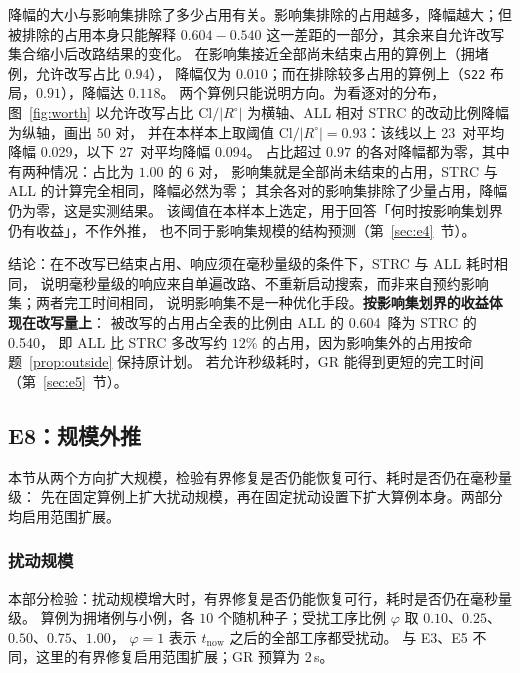 \documentclass[manuscript,screen,review]{acmart}
\providecommand{\STRC}{\textsc{STRC}}
\newcommand{\NSeeds}{10}
\newcommand{\NPairs}{50}
\newcommand{\ResFracCheapRtwo}{0.540}
\newcommand{\ResFracAllFuture}{0.604}
\newcommand{\ScaleCloAliveHi}{0.91}  %
\newcommand{\WorthThresh}{0.93}
\newcommand{\WorthLowN}{27}
\newcommand{\WorthLowMean}{0.094}
\newcommand{\WorthHighN}{23}
\newcommand{\WorthHighMean}{0.029}
\newcommand{\WorthVanish}{0.97}
\begin{document}
降幅的大小与影响集排除了多少占用有关。影响集排除的占用越多，降幅越大；但被排除的占用本身只能解释
\(\ResFracAllFuture-\ResFracCheapRtwo\) 这一差距的一部分，其余来自允许改写集合缩小后改路结果的变化。
在影响集接近全部尚未结束占用的算例上（拥堵例，允许改写占比 \(0.94\)），
降幅仅为 \(0.010\)；而在排除较多占用的算例上（\texttt{S22} 布局，\(0.91\)），降幅达 \(0.118\)。
两个算例只能说明方向。为看逐对的分布，图~\ref{fig:worth} 以允许改写占比
\(\mathrm{Cl}/|R^{\circ}|\) 为横轴、ALL 相对 \STRC{} 的改动比例降幅为纵轴，画出 \(\NPairs\) 对，
并在本样本上取阈值 \(\mathrm{Cl}/|R^{\circ}|=\WorthThresh\)：该线以上 \WorthHighN\ 对平均降幅
\WorthHighMean，以下 \WorthLowN\ 对平均降幅 \WorthLowMean。
占比超过 \(\WorthVanish\) 的各对降幅都为零，其中有两种情况：占比为 \(1.00\) 的 \(6\) 对，
影响集就是全部尚未结束的占用，\STRC{} 与 ALL 的计算完全相同，降幅必然为零；
其余各对的影响集排除了少量占用，降幅仍为零，这是实测结果。
该阈值在本样本上选定，用于回答「何时按影响集划界仍有收益」，不作外推，
也不同于影响集规模的结构预测（第~\ref{sec:e4}~节）。

结论：在不改写已结束占用、响应须在毫秒量级的条件下，\STRC{} 与 ALL 耗时相同，
说明毫秒量级的响应来自单遍改路、不重新启动搜索，而非来自预约影响集；两者完工时间相同，
说明影响集不是一种优化手段。\textbf{按影响集划界的收益体现在改写量上}：
被改写的占用占全表的比例由 ALL 的 \ResFracAllFuture\ 降为 \STRC{} 的 \ResFracCheapRtwo，
即 ALL 比 \STRC{} 多改写约 \(12\%\) 的占用，因为影响集外的占用按命题~\ref{prop:outside} 保持原计划。
若允许秒级耗时，GR 能得到更短的完工时间（第~\ref{sec:e5}~节）。

\subsection{E8：规模外推}
\label{sec:e8}

本节从两个方向扩大规模，检验有界修复是否仍能恢复可行、耗时是否仍在毫秒量级：
先在固定算例上扩大扰动规模，再在固定扰动设置下扩大算例本身。两部分均启用范围扩展。

\subsubsection{扰动规模}
\label{sec:scale}

本部分检验：扰动规模增大时，有界修复是否仍能恢复可行，耗时是否仍在毫秒量级。
算例为拥堵例与小例，各 \(\NSeeds\) 个随机种子；受扰工序比例 \(\varphi\) 取 \(0.10\)、\(0.25\)、\(0.50\)、\(0.75\)、\(1.00\)，
\(\varphi=1\) 表示 \(t_{\mathrm{now}}\) 之后的全部工序都受扰动。
与 E3、E5 不同，这里的有界修复启用范围扩展；GR 预算为 \(2\)\,s。
\end{document}
